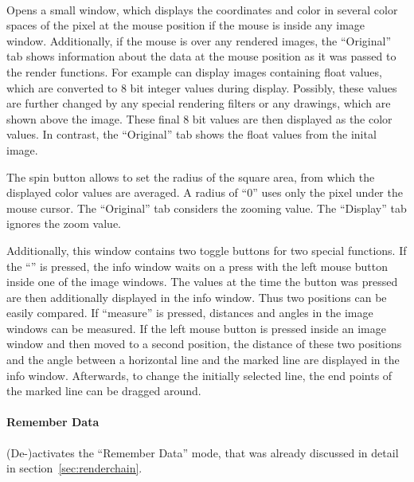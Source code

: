 \paragraph{}
Opens a small window, which displays the coordinates and color in
several color spaces of the pixel at the mouse position if the
mouse is inside any image window. Additionally, if the mouse is over
any rendered images, the ``Original'' tab shows information about
the data at the mouse position as it was passed to the \icewing{}
render functions. For example \icewing{} can display images
containing float values, which are converted to 8 bit integer values
during display. Possibly, these values are further changed by any
special rendering filters or any drawings, which are shown above the
image. These final 8 bit values are then displayed as the color
values. In contrast, the ``Original'' tab shows the float values
from the inital image.

The spin button allows to set the radius of the square area, from
which the displayed color values are averaged. A radius of ``0''
uses only the pixel under the mouse cursor. The ``Original'' tab
considers the zooming value. The ``Display'' tab ignores the zoom
value.

Additionally, this window contains two toggle buttons for two
special functions. If the ``'' is pressed, the
info window waits on a press with the left mouse button inside one
of the image windows. The values at the time the button was pressed
are then additionally displayed in the info window. Thus two
positions can be easily compared. If
``measure'' is pressed, distances and angles in the image windows
can be measured. If the left mouse button is pressed inside an image
window and then moved to a second position, the distance of these
two positions and the angle between a horizontal line and the marked
line are displayed in the info window. Afterwards, to change the
initially selected line, the end points of the marked line can be
dragged around.

\paragraph{Remember Data}
(De-)activates the ``Remember Data'' mode, that was already
discussed in detail in section~\ref{sec:renderchain}.

